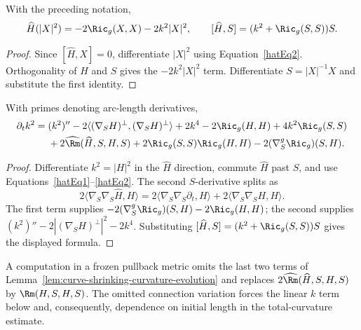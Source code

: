 \begin{lemma}
\label{lem:curve-shrinking-first-variation}
\label{1stcurvshr}
With the preceding notation,
\[
\widehat H(|X|^2)=-2\Ric_g(X,X)-2k^2|X|^2,
\qquad
[\widehat H,S]=(k^2+\Ric_g(S,S))S.
\]
\end{lemma}
\begin{proof}
\sketch Since $[\widehat H,X]=0$, differentiate $|X|^2$ using
Equation~\eqref{hatEq2}. Orthogonality of $H$ and $S$ gives the $-2k^2|X|^2$
term. Differentiate $S=|X|^{-1}X$ and substitute the first identity.
\end{proof}

\begin{lemma}
\label{lem:curve-shrinking-curvature-evolution}
\label{2ndcurvshr}
With primes denoting arc-length derivatives,
\begin{align*}
\partial_tk^2={}&(k^2)''-2\langle(\nabla_SH)^\perp,(\nabla_SH)^\perp\rangle+2k^4
-2\Ric_g(H,H)+4k^2\Ric_g(S,S)\\
&+2\widehat{\Rm}(\widehat H,S,H,S)
+2\Ric_g(S,S)\Ric_g(H,H)-2(\nabla^g_S\Ric_g)(S,H).
\end{align*}
\end{lemma}
\begin{proof}
\sketch Differentiate $k^2=|H|^2$ in the $\widehat H$ direction, commute $\widehat H$
past $S$, and use Equations~\eqref{hatEq1}--\eqref{hatEq2}. The second
$S$-derivative splits as
\begin{equation}\label{hatEq3}
2\langle\nabla_S\nabla_S\widehat H,H\rangle
=2\langle\nabla_S\nabla_S\partial_t,H\rangle
+2\langle\nabla_S\nabla_SH,H\rangle.
\end{equation}
The first term supplies $-2(\nabla^g_S\Ric_g)(S,H)-2\Ric_g(H,H)$; the second
supplies $(k^2)''-2|(\nabla_SH)^\perp|^2-2k^4$. Substituting
$[\widehat H,S]=(k^2+\Ric_g(S,S))S$ gives the displayed formula.
\end{proof}

\begin{remark}
\label{rem:curve-shrinking-evolution-erratum}
A computation in a frozen pullback metric omits the last two terms of
Lemma~\ref{lem:curve-shrinking-curvature-evolution} and replaces
$2\widehat{\Rm}(\widehat H,S,H,S)$ by $\Rm(H,S,H,S)$. The omitted connection
variation forces the linear $k$ term below and, consequently, dependence on
initial length in the total-curvature estimate.
\end{remark}

